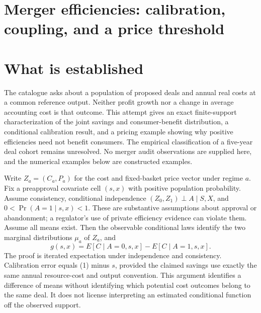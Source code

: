 \documentclass[11pt,a4paper]{article}
\begin{document}
\section*{Merger efficiencies: calibration, coupling, and a price threshold}
\section{What is established}
The catalogue asks about a population of proposed deals and annual real costs at a common reference output. Neither profit growth nor a change in average accounting cost is that outcome. This attempt gives an exact finite-support characterization of the joint savings and consumer-benefit distribution, a conditional calibration result, and a pricing example showing why positive efficiencies need not benefit consumers. The empirical classification of a five-year deal cohort remains unresolved. No merger audit observations are supplied here, and the numerical examples below are constructed examples.

Write $Z_a=(C_a,P_a)$ for the cost and fixed-basket price vector under regime $a$. Fix a preapproval covariate cell $(s,x)$ with positive population probability. Assume consistency, conditional independence $(Z_0,Z_1)\perp A\mid S,X$, and $0<\Pr(A=1\mid s,x)<1$. These are substantive assumptions about approval or abandonment; a regulator's use of private efficiency evidence can violate them. Assume all means exist. Then the observable conditional laws identify the two marginal distributions $\mu_a$ of $Z_a$, and
\[
 g(s,x)=E[C\mid A=0,s,x]-E[C\mid A=1,s,x]. \tag{1}
\]
The proof is iterated expectation under independence and consistency. Calibration error equals (1) minus $s$, provided the claimed savings use exactly the same annual resource-cost and output convention. This argument identifies a difference of means without identifying which potential cost outcomes belong to the same deal. It does not license interpreting an estimated conditional function off the observed support.
\end{document}
